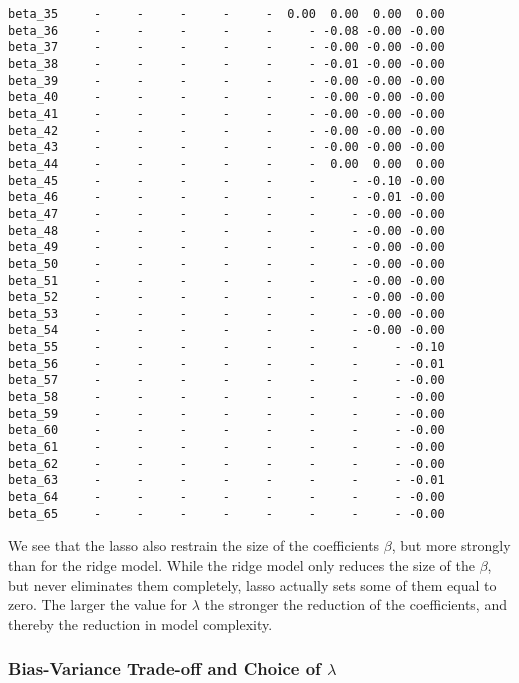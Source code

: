 \documentclass[11pt]{article}
\begin{document}
\begin{verbatim}
beta_35     -     -     -     -     -  0.00  0.00  0.00  0.00
beta_36     -     -     -     -     -     - -0.08 -0.00 -0.00
beta_37     -     -     -     -     -     - -0.00 -0.00 -0.00
beta_38     -     -     -     -     -     - -0.01 -0.00 -0.00
beta_39     -     -     -     -     -     - -0.00 -0.00 -0.00
beta_40     -     -     -     -     -     - -0.00 -0.00 -0.00
beta_41     -     -     -     -     -     - -0.00 -0.00 -0.00
beta_42     -     -     -     -     -     - -0.00 -0.00 -0.00
beta_43     -     -     -     -     -     - -0.00 -0.00 -0.00
beta_44     -     -     -     -     -     -  0.00  0.00  0.00
beta_45     -     -     -     -     -     -     - -0.10 -0.00
beta_46     -     -     -     -     -     -     - -0.01 -0.00
beta_47     -     -     -     -     -     -     - -0.00 -0.00
beta_48     -     -     -     -     -     -     - -0.00 -0.00
beta_49     -     -     -     -     -     -     - -0.00 -0.00
beta_50     -     -     -     -     -     -     - -0.00 -0.00
beta_51     -     -     -     -     -     -     - -0.00 -0.00
beta_52     -     -     -     -     -     -     - -0.00 -0.00
beta_53     -     -     -     -     -     -     - -0.00 -0.00
beta_54     -     -     -     -     -     -     - -0.00 -0.00
beta_55     -     -     -     -     -     -     -     - -0.10
beta_56     -     -     -     -     -     -     -     - -0.01
beta_57     -     -     -     -     -     -     -     - -0.00
beta_58     -     -     -     -     -     -     -     - -0.00
beta_59     -     -     -     -     -     -     -     - -0.00
beta_60     -     -     -     -     -     -     -     - -0.00
beta_61     -     -     -     -     -     -     -     - -0.00
beta_62     -     -     -     -     -     -     -     - -0.00
beta_63     -     -     -     -     -     -     -     - -0.01
beta_64     -     -     -     -     -     -     -     - -0.00
beta_65     -     -     -     -     -     -     -     - -0.00
    \end{verbatim}

    
    We see that the lasso also restrain the size of the coefficients
\(\beta\), but more strongly than for the ridge model. While the ridge
model only reduces the size of the \(\beta\), but never eliminates them
completely, lasso actually sets some of them equal to zero. The larger
the value for \(\lambda\) the stronger the reduction of the
coefficients, and thereby the reduction in model complexity.

    \hypertarget{bias-variance-trade-off-and-choice-of-lambda}{%
\subsubsection{\texorpdfstring{Bias-Variance Trade-off and Choice of
\(\lambda\)}{Bias-Variance Trade-off and Choice of \textbackslash lambda}}\label{bias-variance-trade-off-and-choice-of-lambda}}
\end{document}
